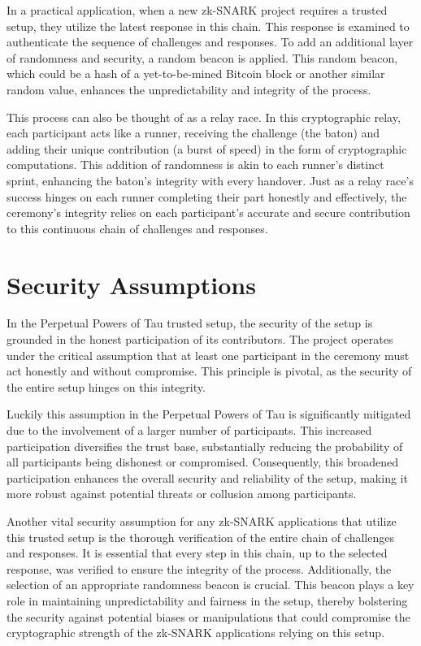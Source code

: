 \documentclass[11pt]{article}
\begin{document}
In a practical application, when a new zk-SNARK project requires a trusted setup, they utilize the latest response in this chain. This response is examined to authenticate the sequence of challenges and responses. To add an additional layer of randomness and security, a random beacon is applied. This random beacon, which could be a hash of a yet-to-be-mined Bitcoin block or another similar random value, enhances the unpredictability and integrity of the process.

This process can also be thought of as a relay race. In this cryptographic relay, each participant acts like a runner, receiving the challenge (the baton) and adding their unique contribution (a burst of speed) in the form of cryptographic computations. This addition of randomness is akin to each runner’s distinct sprint, enhancing the baton's integrity with every handover. Just as a relay race's success hinges on each runner completing their part honestly and effectively, the ceremony's integrity relies on each participant's accurate and secure contribution to this continuous chain of challenges and responses.
\section{Security Assumptions}
\label{sec:org57b3112}

In the Perpetual Powers of Tau trusted setup, the security of the setup is grounded in the honest participation of its contributors. The project operates under the critical assumption that at least one participant in the ceremony must act honestly and without compromise. This principle is pivotal, as the security of the entire setup hinges on this integrity.

Luckily this assumption in the Perpetual Powers of Tau is significantly mitigated due to the involvement of a larger number of participants. This increased participation diversifies the trust base, substantially reducing the probability of all participants being dishonest or compromised. Consequently, this broadened participation enhances the overall security and reliability of the setup, making it more robust against potential threats or collusion among participants.

Another vital security assumption for any zk-SNARK applications that utilize this trusted setup is the thorough verification of the entire chain of challenges and responses. It is essential that every step in this chain, up to the selected response, was verified to ensure the integrity of the process. Additionally, the selection of an appropriate randomness beacon is crucial. This beacon plays a key role in maintaining unpredictability and fairness in the setup, thereby bolstering the security against potential biases or manipulations that could compromise the cryptographic strength of the zk-SNARK applications relying on this setup.
\end{document}
